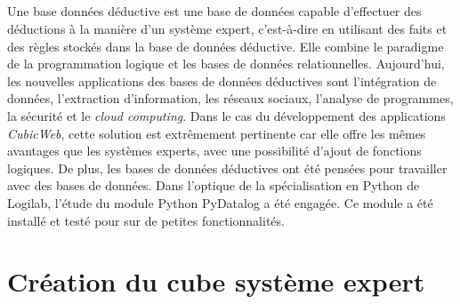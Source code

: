 \documentclass {report}
\begin{document}
\paragraph{}
Une base données déductive est une base de données capable d'effectuer des déductions à la manière d'un système expert, c'est-à-dire en utilisant des faits et des règles stockés dans la base de données déductive. Elle combine le paradigme de la programmation logique et les bases de données relationnelles. Aujourd'hui, les nouvelles applications des bases de données déductives sont l'intégration de données, l'extraction d'information, les réseaux sociaux, l'analyse de programmes, la sécurité et le \textit{cloud computing}\footnotemark[1]. Dans le cas du développement des applications \textit{CubicWeb}, cette solution est extrêmement pertinente car elle offre les mêmes avantages que les systèmes experts, avec une possibilité d'ajout de fonctions logiques. De plus, les bases de données déductives ont été pensées pour travailler avec des bases de données. Dans l'optique de la spécialisation en Python de Logilab, l'étude du module Python PyDatalog a été engagée. Ce module a été installé et testé pour sur de petites fonctionnalités.



\chapter{Création du cube système expert}
\end{document}
